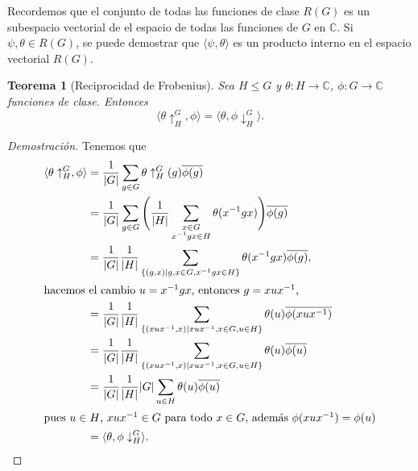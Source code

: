 \documentclass[12pt]{book}
\newtheorem{theorem}{Teorema}[section]
\theoremstyle{definition}
\newcounter{in}
\begin{document}
Recordemos que el conjunto de todas las funciones de clase $R(G)$ es
un subespacio vectorial de el espacio de todas las funciones  de $G$
en $\mathbb{C}$. Si~$\psi,\theta\in R(G)$, se puede demostrar que 
$\langle\psi,\theta\rangle$ es un producto interno en el espacio
vectorial $R(G)$.
\begin{theorem}[Reciprocidad de Frobenius]
  \label{frobenius}
  Sea $H\leq G$ y $\theta:H\rightarrow\mathbb{C}$,
  $\phi:G\rightarrow \mathbb{C}$ funciones de
  clase. Entonces
  \begin{equation*}
    \langle\theta\uparrow^{G}_{H},\phi\rangle=\langle\theta,\phi\downarrow^{G}_{H}\rangle.
  \end{equation*}
\end{theorem}
\begin{proof}[Demostración]
  Tenemos que 
  \begin{align*}
    \langle\theta\uparrow^{G}_{H},\phi\rangle&=\frac{1}{|G|}\sum_{g\in
      G}\theta\uparrow^{G}_{H}(g)\overline{\phi(g)}\\
    &=\frac{1}{|G|}\sum_{g\in G}\Bigg(\frac{1}{|H|}\sum_{\substack{x\in
        G\\x^{-1}gx\in H}}\theta(x^{-1}gx)\Bigg)\overline{\phi(g)}\\
    &=\frac{1}{|G|}\frac{1}{|H|}\sum_{\{(g,x)\mid g,x\in G,x^{-1}gx\in
      H\}}\theta(x^{-1}gx)\overline{\phi(g)},\\
    \intertext{hacemos el cambio $u=x^{-1}gx$, entonces $g=xux^{-1}$,}
    &=\frac{1}{|G|}\frac{1}{|H|}\sum_{\{(xux^{-1},x)\mid xux^{-1},x\in
      G,u\in H\}}\theta(u)\overline{\phi(xux^{-1})}\\
    &=\frac{1}{|G|}\frac{1}{|H|}\sum_{\{(xux^{-1},x)\mid xux^{-1},x\in G,u\in H\}}\theta(u)\overline{\phi(u)}\\
    &=\frac{1}{|G|}\frac{1}{|H|}|G|\sum_{u\in
      H}\theta(u)\overline{\phi(u)}\\
    \intertext{pues $u\in H$, $xux^{-1}\in G$ para todo $x\in G$,
      además $\phi(xux^{-1})=\phi(u)$}
    &=\langle\theta,\phi\downarrow^{G}_{H}\rangle.
 \end{align*} 
\end{proof}
\end{document}
